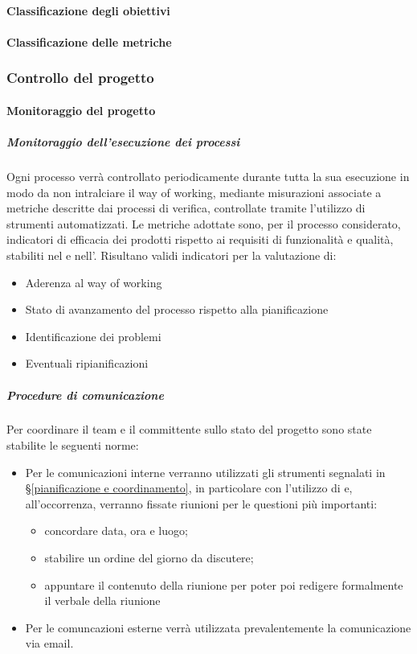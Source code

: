 			\paragraph{Classificazione degli obiettivi}
			
			\paragraph{Classificazione delle metriche}
			
		\subsubsection{Controllo del progetto}

			\paragraph{Monitoraggio del progetto}

			\subparagraph{Monitoraggio dell'esecuzione dei processi}
			Ogni processo verrà controllato periodicamente durante tutta la sua esecuzione in modo da non intralciare il way of working,
			mediante misurazioni associate a metriche descritte dai processi di verifica, controllate tramite l'utilizzo di strumenti automatizzati.
			Le metriche adottate sono, per il processo considerato, indicatori di efficacia dei prodotti rispetto ai requisiti di funzionalità e qualità,
			stabiliti nel  e nell'. Risultano validi indicatori per la valutazione di:
			\begin{itemize}
				\item Aderenza al way of working
				\item Stato di avanzamento del processo rispetto alla pianificazione
				\item Identificazione dei problemi
				\item Eventuali ripianificazioni
			\end{itemize}

			\subparagraph{Procedure di comunicazione}
			Per coordinare il team e il committente sullo stato del progetto sono state stabilite le seguenti norme:
			\begin{itemize}
				\item Per le comunicazioni interne verranno utilizzati gli strumenti segnalati in \S\ref{pianificazione e coordinamento}, in particolare
					con l'utilizzo di  e, all'occorrenza, verranno fissate riunioni per le questioni più importanti:
					\begin{itemize}
						\item concordare data, ora e luogo;
						\item stabilire un ordine del giorno da discutere;
						\item appuntare il contenuto della riunione per poter poi redigere formalmente il verbale della riunione
					\end{itemize}
				\item Per le comuncazioni esterne verrà utilizzata prevalentemente la comunicazione via email. %
			\end{itemize}



